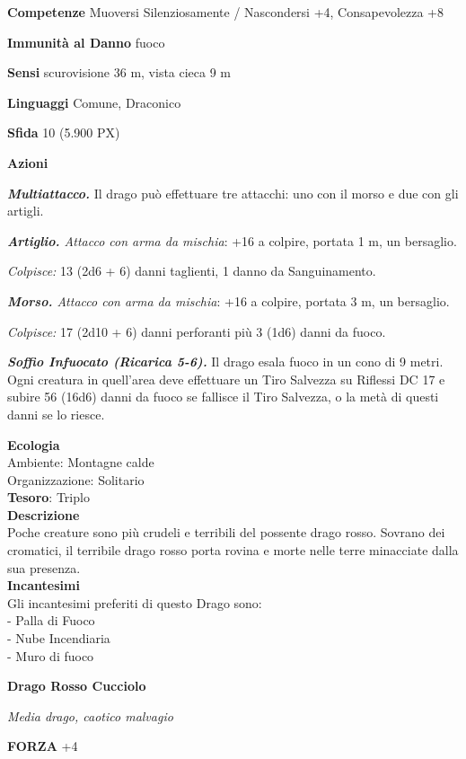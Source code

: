 \begin{multicols}{2}
\textbf{Competenze} Muoversi Silenziosamente / Nascondersi +4, Consapevolezza +8

\textbf{Immunità al Danno} fuoco

\textbf{Sensi} scurovisione 36 m, vista cieca 9 m

\textbf{Linguaggi} Comune, Draconico

\textbf{Sfida} 10 (5.900 PX)

\textbf{Azioni}

\textit{\textbf{Multiattacco.}} Il drago può effettuare tre attacchi: uno con il morso e due con gli artigli.

\textit{\textbf{Artiglio.} Attacco con arma da mischia}: +16 a colpire, portata 1 m, un bersaglio.

\textit{Colpisce:} 13 (2d6 + 6) danni taglienti, 1 danno da Sanguinamento.

\textit{\textbf{Morso.} Attacco con arma da mischia}: +16 a colpire, portata 3 m, un bersaglio.

\textit{Colpisce:} 17 (2d10 + 6) danni perforanti più 3 (1d6) danni da fuoco.

\textit{\textbf{Soffio Infuocato (Ricarica 5-6).}} Il drago esala fuoco in un cono di 9 metri. Ogni creatura in quell'area deve effettuare un Tiro Salvezza su Riflessi DC 17 e subire 56 (16d6) danni da fuoco se fallisce il Tiro Salvezza, o la metà di questi danni se lo riesce.

\textbf{Ecologia}\\
Ambiente: Montagne calde\\
Organizzazione: Solitario\\
\textbf{Tesoro}: Triplo\\
\textbf{Descrizione}\\
Poche creature sono più crudeli e terribili del possente drago rosso. Sovrano dei cromatici, il terribile drago rosso porta rovina e morte nelle terre minacciate dalla sua presenza.\\
\textbf{Incantesimi}\\
Gli incantesimi preferiti di questo Drago sono:\\
- Palla di Fuoco\\
- Nube Incendiaria\\
- Muro di fuoco


\medskip{}\textbf{Drago Rosso Cucciolo}

\textit{Media drago, caotico malvagio}

\textbf{FORZA} +4


\end{multicols}
